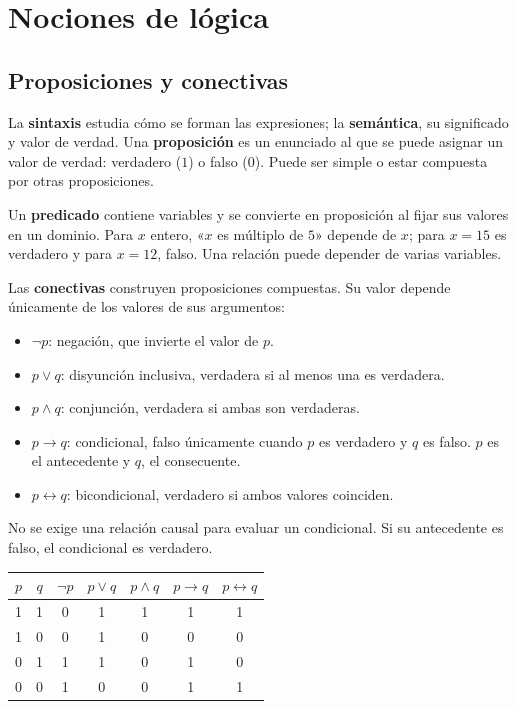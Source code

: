 \chapter{Nociones de lógica}
\label{cap:logica}

\section{Proposiciones y conectivas}

La \textbf{sintaxis} estudia cómo se forman las expresiones; la
\textbf{semántica}, su significado y valor de verdad. Una
\textbf{proposición} es un enunciado al que se puede asignar un valor
de verdad: verdadero ($1$) o falso ($0$). Puede ser simple o estar
compuesta por otras proposiciones.

Un \textbf{predicado} contiene variables y se convierte en proposición
al fijar sus valores en un dominio. Para $x$ entero, «$x$ es múltiplo de $5$»
depende de $x$; para $x=15$ es verdadero y para $x=12$, falso.
Una relación puede depender de varias variables.

Las \textbf{conectivas} construyen proposiciones compuestas. Su valor
depende únicamente de los valores de sus argumentos:
\begin{itemize}
 \item $\neg p$: negación, que invierte el valor de $p$.
 \item $p\vee q$: disyunción inclusiva, verdadera si al menos una es verdadera.
 \item $p\wedge q$: conjunción, verdadera si ambas son verdaderas.
 \item $p\to q$: condicional, falso únicamente cuando $p$ es verdadero y
       $q$ es falso. $p$ es el antecedente y $q$, el consecuente.
 \item $p\leftrightarrow q$: bicondicional, verdadero si ambos valores coinciden.
\end{itemize}
No se exige una relación causal para evaluar un condicional. Si su
antecedente es falso, el condicional es verdadero.

\begin{center}
\begin{tabular}{@{}ccccccc@{}}
\toprule
$p$ & $q$ & $\neg p$ & $p\vee q$ & $p\wedge q$ & $p\to q$ & $p\leftrightarrow q$\\
\midrule
1&1&0&1&1&1&1\\
1&0&0&1&0&0&0\\
0&1&1&1&0&1&0\\
0&0&1&0&0&1&1\\
\bottomrule
\end{tabular}
\end{center}

